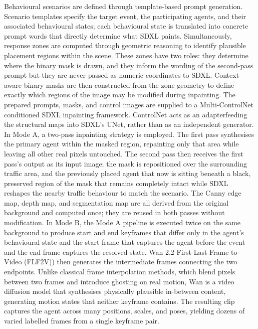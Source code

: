 Behavioural scenarios are defined through template-based prompt generation. Scenario templates specify the target event, the participating agents, and their associated behavioural states; each behavioural state is translated into concrete prompt words that directly determine what SDXL paints. Simultaneously, response zones are computed through geometric reasoning to identify plausible placement regions within the scene. These zones have two roles: they determine where the binary mask is drawn, and they inform the wording of the second-pass prompt but they are never passed as numeric coordinates to SDXL. Context-aware binary masks are then constructed from the zone geometry to define exactly which regions of the image may be modified during inpainting.
The prepared prompts, masks, and control images are supplied to a Multi-ControlNet\cite{zhang2023controlnet} conditioned SDXL inpainting framework. ControlNet acts as an adapterfeeding the structural maps into SDXL's UNet, rather than as an independent generator. In Mode A, a two-pass inpainting strategy is employed. The first pass synthesises the primary agent within the masked region, repainting only that area while leaving all other real pixels untouched. The second pass then receives the first pass's output as its input image; the mask is repositioned over the surrounding traffic area, and the previously placed agent that now is sitting beneath a black, preserved region of the mask that remains completely intact while SDXL reshapes the nearby traffic behaviour to match the scenario. The Canny edge map, depth map, and segmentation map are all derived from the original background and computed once; they are reused in both passes without modification.
In Mode B, the Mode A pipeline is executed twice on the same background to produce start and end keyframes that differ only in the agent's behavioural state and the start frame that captures the agent before the event and the end frame captures the resolved state. Wan 2.2 First-Last-Frame-to-Video (FLF2V))\cite{wan2025wan} then generates the intermediate frames connecting the two endpoints. Unlike classical frame interpolation methods, which blend pixels between two frames and introduce ghosting on real motion, Wan is a video diffusion model that synthesises physically plausible in-between content, generating motion states that neither keyframe contains. The resulting clip captures the agent across many positions, scales, and poses, yielding dozens of varied labelled frames from a single keyframe pair.
